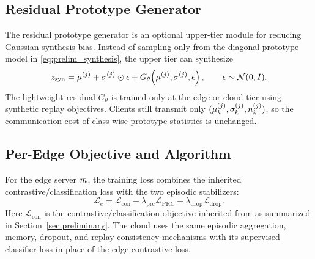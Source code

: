 \subsection{Residual Prototype Generator}
The residual prototype generator is an optional upper-tier module for reducing Gaussian synthesis bias. Instead of sampling only from the diagonal prototype model in \eqref{eq:prelim_synthesis}, the upper tier can synthesize
\begin{equation}
    z_{\mathrm{syn}}
    =
    \mu^{(j)}
    +
    \sigma^{(j)}\odot\epsilon
    +
    G_{\theta}\!\left(\mu^{(j)},\sigma^{(j)},\epsilon\right),
    \qquad
    \epsilon\sim\mathcal{N}(0,I).
    \label{eq:residual_synthesis}
\end{equation}
The lightweight residual $G_{\theta}$ is trained only at the edge or cloud tier using synthetic replay objectives. Clients still transmit only $(\mu_k^{(j)},\sigma_k^{(j)},n_k^{(j)})$, so the communication cost of class-wise prototype statistics is unchanged.

\subsection{Per-Edge Objective and Algorithm}
For the edge server $m$, the training loss combines the inherited \hsfp contrastive/classification loss with the two episodic stabilizers:
\begin{equation}
    \mathcal{L}_{e}
    =
    \mathcal{L}_{\mathrm{con}}
    +
    \lambda_{\mathrm{prc}}\mathcal{L}_{\mathrm{PRC}}
    +
    \lambda_{\mathrm{drop}}\mathcal{L}_{\mathrm{drop}} .
    \label{eq:edge_loss}
\end{equation}
Here $\mathcal{L}_{\mathrm{con}}$ is the contrastive/classification objective inherited from \hsfp as summarized in Section~\ref{sec:preliminary}. The cloud uses the same episodic aggregation, memory, dropout, and replay-consistency mechanisms with its supervised classifier loss in place of the edge contrastive loss.

